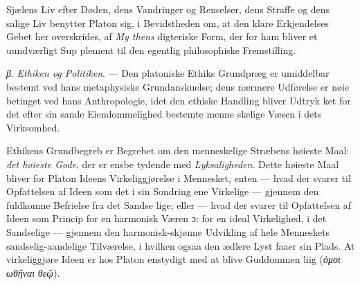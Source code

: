\documentclass[12pt,a4paper]{book}
\newcommand{\gk}[1]{\textit{#1}}
\begin{document}
Sjælens Liv efter Døden, dens Vandringer og Renselser, dens
Straffe og dens salige Liv benytter Platon sig, i Bevidstheden
om, at den klare Erkjendelses Gebet her overskrides, af \emph{My\-%
thens} digteriske Form, der for ham bliver et uundværligt Sup\-%
plement til den egentlig philosophiske Fremstilling.

\gk{β}. \emph{Ethiken og Politiken}. --- Den platoniske Ethiks
Grundpræg er umiddelbar bestemt ved hans metaphysiske
Grundanskuelse; dens nærmere Udførelse er nøie betinget ved
hans Anthropologie, idet den ethiske Handling bliver Udtryk\-%
ket for det efter sin sande Eiendommelighed bestemte menne\-%
skelige Væsen i dets Virksomhed.

Ethikens Grundbegreb er Begrebet om den menneskelige
Stræbens høieste Maal: \emph{det høieste Gode}, der er ensbe\-%
tydende med \emph{Lyksaligheden}. Dette høieste Maal bliver for
Platon Ideens Virkeliggjørelse i Mennesket, enten --- hvad der
svarer til Opfattelsen af Ideen som det i sin Sondring ene
Virkelige --- gjennem den fuldkomne Befrielse fra det Sandse\-%
lige; eller --- hvad der svarer til Opfattelsen af Ideen som
Princip for en harmonisk Væren ɔ: for en ideal Virkelighed,
i det Sandselige --- gjennem den harmonisk-skjønne Udvikling
af hele Menneskets sandselig-aandelige Tilværelse, i hvilken
ogsaa den ædlere Lyst faaer sin Plads. At virkeliggjøre Ideen
er hos Platon enstydigt med at blive Guddommen liig (\gk{ὁμοι\-%
ωθῆναι} \gk{θεῷ}).
\end{document}

